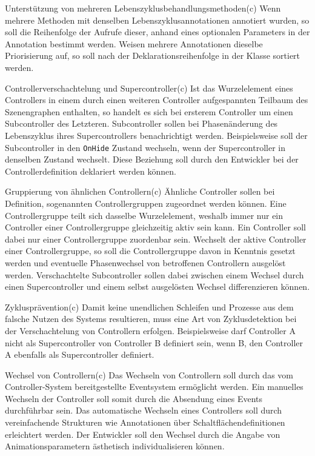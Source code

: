 \begin{freq}{Unterstützung von mehreren Lebenszyklusbehandlungsmethoden}(c)
	Wenn mehrere Methoden mit denselben Lebenszyklusannotationen annotiert wurden, so soll die Reihenfolge der Aufrufe dieser, anhand eines optionalen Parameters in der Annotation bestimmt werden. Weisen mehrere Annotationen dieselbe Priorisierung auf, so soll nach der Deklarationsreihenfolge in der Klasse sortiert werden.
\end{freq}
\begin{freq}{Controllerverschachtelung und Supercontroller}(c)
	Ist das Wurzelelement eines Controllers in einem durch einen weiteren Controller aufgespannten Teilbaum des Szenengraphen enthalten, so handelt es sich bei ersterem Controller um einen Subcontroller des Letzteren. Subcontroller sollen bei Phasenänderung des Lebenszyklus ihres Supercontrollers benachrichtigt werden. Beispielsweise soll der Subcontroller in den \texttt{OnHide} Zustand wechseln, wenn der Supercontroller in denselben Zustand wechselt. Diese Beziehung soll durch den Entwickler bei der Controllerdefinition deklariert werden können.
\end{freq}
\begin{freq}{Gruppierung von ähnlichen Controllern}(c)
	Ähnliche Controller sollen bei Definition, sogenannten Controllergruppen zugeordnet werden können. Eine Controllergruppe teilt sich dasselbe Wurzelelement, weshalb immer nur ein Controller einer Controllergruppe gleichzeitig aktiv sein kann. Ein Controller soll dabei nur einer Controllergruppe zuordenbar sein. Wechselt der aktive Controller einer Controllergruppe, so soll die Controllergruppe davon in Kenntnis gesetzt werden und eventuelle Phasenwechsel von betroffenen Controllern ausgelöst werden. Verschachtelte Subcontroller sollen dabei zwischen einem Wechsel durch einen Supercontroller und einem selbst ausgelösten Wechsel differenzieren können.
\end{freq}
\begin{freq}{Zyklusprävention}(c)
	Damit keine unendlichen Schleifen und Prozesse aus dem falsche Nutzen des Systems resultieren, muss eine Art von Zyklusdetektion bei der Verschachtelung von Controllern erfolgen. Beispielsweise darf Controller A nicht als Supercontroller von Controller B definiert sein, wenn B, den Controller A ebenfalls als Supercontroller definiert.
\end{freq}
\begin{freq}{Wechsel von Controllern}(c)
	Das Wechseln von Controllern soll durch das vom Controller-System bereitgestellte Eventsystem ermöglicht werden. Ein manuelles Wechseln der Controller soll somit durch die Absendung eines Events durchführbar sein. Das automatische Wechseln eines Controllers soll durch vereinfachende Strukturen wie Annotationen über Schaltflächendefinitionen erleichtert werden. Der Entwickler soll den Wechsel durch die Angabe von Animationsparametern ästhetisch individualisieren können.
\end{freq}
